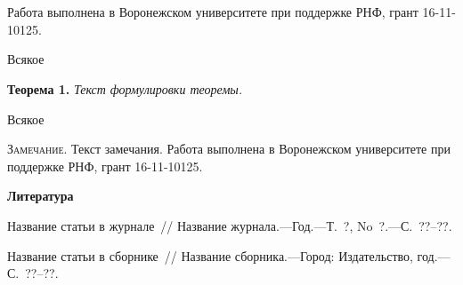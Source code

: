 %

\\
\\












{\small Работа выполнена в Воронежском университете при поддержке РНФ, грант 16-11-10125.}


\printbibliography

\printbibliography[env=thebibliography]






%
\begin{theorem}
	Всякое
\end{theorem}


 \textbf{Теорема 1.} \textsl{Текст формулировки теоремы.}
%
%
%
%
%

\begin{remark*}
	Всякое
\end{remark*}


\textsc{Замечание.} Текст замечания.
%
%
%
%
{\small Работа выполнена в Воронежском университете при поддержке РНФ, грант 16-11-10125.}
%
%
%
%

\par\bigskip\centerline{\bf Литература}\smallskip

 \begin{enumerate}

 \itemsep=0pt\parskip=0pt



 {Название статьи в
журнале~/\!/ Название журнала.---Год.---Т.~?, No~?.---С.~??--??.}

{Название статьи в сборнике~/\!/ Название сборника.---Город:
Издательство, год.---С.~??--??.}

 \end{enumerate}





